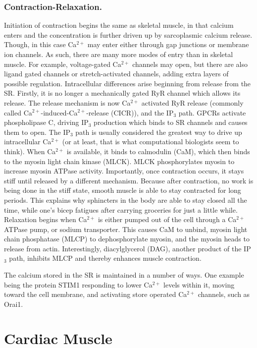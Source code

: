 \documentclass[12pt]{report}
\begin{document}
\subsubsection{Contraction-Relaxation.} 
Initiation of contraction begins the same as skeletal muscle, in that calcium enters and the concentration is further driven up by sarcoplasmic calcium release. Though, in this case Ca$^{2+}$ may enter either through gap junctions or membrane ion channels. As such, there are many more modes of entry than in skeletal muscle. For example, voltage-gated Ca$^{2+}$ channels may open, but there are also ligand gated channels or stretch-activated channels, adding extra layers of possible regulation. Intracellular differences arise beginning from release from the SR. Firstly, it is no longer a mechanically gated RyR channel which allows its release. The release mechanism is now Ca$^{2+}$ activated RyR release (commonly called Ca$^{2+}$-induced-Ca$^{2+}$-release (CICR)), and the IP$_3$ path. GPCRs activate phospholipase C, driving IP$_3$ production which binds to SR channels and causes them to open. The IP$_3$ path is usually considered the greatest way to drive up intracellular Ca$^{2+}$ (or at least, that is what computational biologists seem to think). When Ca$^{2+}$ is available, it binds to calmodulin (CaM), which then binds to the myosin light chain kinase (MLCK). MLCK phosphorylates myosin to increase myosin ATPase activity. Importantly, once contraction occurs, it stays stiff until released by a different mechanism. Because after contraction, no work is being done in the stiff state, smooth muscle is able to stay contracted for long periods. This explains why sphincters in the body are able to stay closed all the time, while one's bicep fatigues after carrying groceries for just a little while. Relaxation begins when Ca$^{2+}$ is either pumped out of the cell through a Ca$^{2+}$ATPase pump, or sodium transporter. This causes CaM to unbind, myosin light chain phosphatase (MLCP) to dephosphorylate myosin, and the myosin heads to release from actin. Interestingly, diacylglycerol (DAG), another product of the IP$_3$ path, inhibits MLCP and thereby enhances muscle contraction.\newline

The calcium stored in the SR is maintained in a number of ways. One example being the protein STIM1 responding to lower Ca$^{2+}$ levels within it, moving toward the cell membrane, and activating store operated Ca$^{2+}$ channels, such as Orai1. 

\section{Cardiac Muscle}
\end{document}
